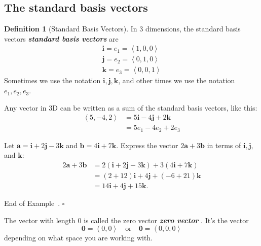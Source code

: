 \documentclass[10pt]{article}
\DeclareRobustCommand{\demph}[1]{%
  \ifmmode
  {\color{Blue}#1}%
  \else
  {\color{Blue}\bfseries\slshape #1}%
  \fi
}
\theoremstyle{definition}
\newtheorem{definition}[theorem]{Definition}
\newtheorem{example}[theorem]{Example}
\renewenvironment{example}
{\begin{oldexample}}
  {\par\smallskip\hfill   End of Example~\theexample. $\square$    \par\end{oldexample}}
\newcommand{\1}[1]{\textbf{1}_{\left[#1\right]}} %
\begin{document}
\subsection{The standard basis vectors}


\begin{definition}[Standard Basis Vectors]
  In 3 dimensions, the \demph{standard basis vectors} are
  \begin{gather}
    \mathbf{i} = e_{1} = \left\langle 1,0,0 \right\rangle \\
    \mathbf{j} = e_{2} = \left\langle 0,1,0 \right\rangle \\
    \mathbf{k} = e_{3} = \left\langle 0,0,1 \right\rangle
  \end{gather}
  Sometimes we use the notation $\mathbf{i}, \mathbf{j}, \mathbf{k}$, and other times we use the
  notation $e_{1},e_{2},e_{3}$. 
\end{definition}


Any vector in 3D can be written as a sum of the standard basis vectors, like this:
\begin{align*}
  \left\langle 5,-4,2 \right\rangle 
  &= 5 \mathbf{i} -4 \mathbf{j} + 2 \mathbf{k}\\
  &= 5 e_{1} -4 e_{2} + 2 e_{3}
\end{align*}


\begin{example}
  Let $\mathbf{a} = \mathbf{i}+2\mathbf{j}-3\mathbf{k}$ and $\mathbf{b} = 4\mathbf{i}+7\mathbf{k}$. Express the
  vector $2\mathbf{a}+3\mathbf{b}$ in terms of $\mathbf{i},\mathbf{j},$ and $\mathbf{k}$:
  \begin{align*}
    2\mathbf{a}+3\mathbf{b}
    &=2 \left(\mathbf{i}+2\mathbf{j}-3\mathbf{k}  \right)
      + 3 \left( 4\mathbf{i}+7\mathbf{k} \right)\\ 
    &= (2+12)\mathbf{i} + 4 \mathbf{j} + (-6+21)\mathbf{k}\\
    &= 14 \mathbf{i} + 4 \mathbf{j} + 15 \mathbf{k}.
  \end{align*}
\end{example}

The vector with length $0$ is called the \demph{zero vector}. It's the vector
\begin{equation*}
  \mathbf{0} = \left\langle 0,0 \right\rangle
  \quad \text{or} \quad
  \mathbf{0} = \left\langle 0,0,0 \right\rangle 
\end{equation*}
depending on what space you are working with.
\end{document}
